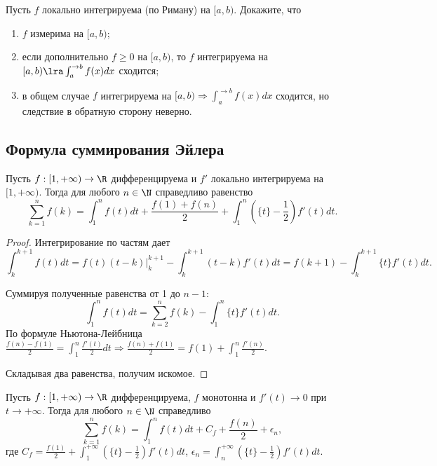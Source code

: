 
\begin{problem}
    Пусть $f$ локально интегрируема (по Риману) на $[a, b)$. Докажите, что
    \begin{enumerate}
        \item $f$ измерима на $[a, b)$;
        \item если дополнительно $f \geq 0$ на $[a, b)$, то $f$ интегрируема на $[a, b) \lra \int_{a}^{\to b}f(x) dx$ сходится;
        \item в общем случае $f$ интегрируема на $[a, b) \Rightarrow \int_{a}^{\to b} f(x) dx$ сходится, но следствие в обратную сторону неверно.
    \end{enumerate}
\end{problem}

\subsection{Формула суммирования Эйлера}

\begin{theorem}[Эйлер]
    Пусть $f: [1, +\infty) \to \R$ дифференцируема и $f'$ локально интегрируема на $[1, +\infty)$. Тогда для любого $n \in \N$ справедливо равенство
    \[\sum_{k = 1}^{n} f(k) = \int_{1}^{n}f(t)dt + \frac{f(1) + f(n)}{2} + \int_{1}^{n}\left(\{t\} - \frac{1}{2}\right)f'(t)dt.\]
\end{theorem}

\begin{proof}
    Интегрирование по частям дает
    \[\int_{k}^{k + 1}f(t)dt = f(t)(t - k)\left.\right|_{k}^{k + 1} - \int_{k}^{k + 1}(t - k)f'(t)dt = f(k + 1) - \int_{k}^{k + 1}\{t\}f'(t)dt.\]

    Суммируя полученные равенства от 1 до $n - 1$:
    \[\int_{1}^{n}f(t)dt = \sum_{k = 2}^{n}f(k) - \int_{1}^{n}\{t\}f'(t)dt.\]
    По формуле Ньютона-Лейбница $\frac{f(n) - f(1)}{2} = \int_{1}^{n}\frac{f'(t)}{2}dt \Rightarrow \frac{f(n) + f(1)}{2} = f(1) + \int_{1}^{n}\frac{f'(n)}{2}$.

    Складывая два равенства, получим искомое. 
\end{proof}

\begin{corollary}
    Пусть $f: [1, +\infty) \to \R$ дифференцируема, $f$ монотонна и $f'(t) \to 0$ при $t \to +\infty$. Тогда для любого $n \in \N$ справедливо
    \[\sum_{k = 1}^{n}f(k) = \int_{1}^{n}f(t)dt + C_{f} + \frac{f(n)}{2} + \epsilon_{n},\]
    где $C_{f} = \frac{f(1)}{2} + \int_{1}^{+\infty}\left(\{t\} - \frac{1}{2}\right)f'(t)dt$, $\epsilon_{n} = \int_{n}^{+\infty}\left(\{t\} - \frac{1}{2}\right)f'(t)dt$.
\end{corollary}

